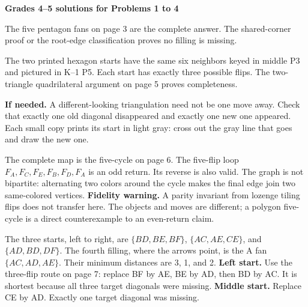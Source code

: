 \documentclass[11pt,letterpaper]{article}
\newcommand{\pagehead}[1]{{\Large\bfseries #1}\par\vspace{3pt}}
\newcommand{\prob}[2]{\par\vspace{5pt}{\large\bfseries #1}\par #2}
\newcommand{\hint}[1]{\par\textbf{If needed.} #1\par}
\begin{document}
\newpage
\pagehead{Grades 4--5 solutions for Problems 1 to 4}
\prob{Problem 1}{The five pentagon fans on page 3 are the complete answer. The shared-corner proof or the root-edge classification proves no filling is missing.}
\prob{Problem 2}{The two printed hexagon starts have the same six neighbors keyed in middle P3 and pictured in K--1 P5. Each start has exactly three possible flips. The two-triangle quadrilateral argument on page 5 proves completeness.}
\hint{A different-looking triangulation need not be one move away. Check that exactly one old diagonal disappeared and exactly one new one appeared. Each small copy prints its start in light gray: cross out the gray line that goes and draw the new one.}
\prob{Problem 3}{The complete map is the five-cycle on page 6. The five-flip loop $F_A,F_C,F_E,F_B,F_D,F_A$ is an odd return. Its reverse is also valid. The graph is not bipartite: alternating two colors around the cycle makes the final edge join two same-colored vertices.}
\textbf{Fidelity warning.} A parity invariant from lozenge tiling flips does not transfer here. The objects and moves are different; a polygon five-cycle is a direct counterexample to an even-return claim.
\prob{Problem 4}{The three starts, left to right, are $\{BD,BE,BF\}$, $\{AC,AE,CE\}$, and $\{AD,BD,DF\}$. The fourth filling, where the arrows point, is the A fan $\{AC,AD,AE\}$. Their minimum distances are 3, 1, and 2.}
\textbf{Left start.} Use the three-flip route on page 7: replace BF by AE, BE by AD, then BD by AC. It is shortest because all three target diagonals were missing.
\textbf{Middle start.} Replace CE by AD. Exactly one target diagonal was missing.
\end{document}
